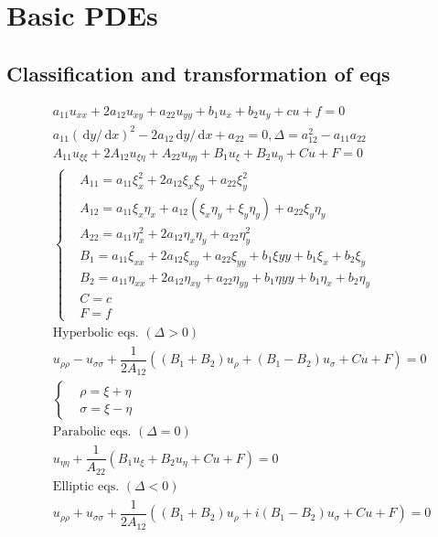 \documentclass[10pt, a4paper, twocolumn]{article}
\def\d{\,\mathrm{d}}
\begin{document}
\section{Basic PDEs}
\subsection{Classification and transformation of eqs}

	\begin{align*}
		&a_{11}u_{xx} + 2a_{12}u_{xy} + a_{22}u_{yy} + b_1u_x + b_2u_y + cu + f = 0\\
		&a_{11}\left(\d y/\d x\right)^2 - 2a_{12}\d y/\d x + a_{22} = 0, \Delta = a_{12}^2 - a_{11}a_{22}\\
		&A_{11}u_{\xi\xi} + 2A_{12}u_{\xi\eta} + A_{22}u_{\eta\eta} + B_1u_\xi + B_2u_\eta + Cu + F = 0\\
		&\left\{\begin{aligned}
			&A_{11} = a_{11}\xi_x^2 + 2a_{12}\xi_x\xi_y + a_{22}\xi_y^2\\
			&A_{12} = a_{11}\xi_x\eta_x + a_{12}(\xi_x\eta_y+\xi_y\eta_y)+a_22\xi_y\eta_y\\
			&A_{22} = a_{11}\eta_x^2 + 2a_{12}\eta_x\eta_y + a_{22}\eta_y^2\\
			&B_1=a_{11}\xi_{xx} + 2a_{12}\xi_{xy} + a_{22}\xi_{yy} + b_1\xi{yy}
			+b_1\xi_x + b_2\xi_y\\
			&B_2=a_{11}\eta_{xx} + 2a_{12}\eta_{xy} + a_{22}\eta_{yy} + b_1\eta{yy}
			+b_1\eta_x + b_2\eta_y\\
			&C=c\\
			&F=f
		\end{aligned}\right.\\
		&\text{Hyperbolic eqs. } (\Delta > 0)\\
		&u_{\rho\rho} - u_{\sigma\sigma} + \dfrac{1}{2A_{12}}
			((B_1+B_2)u_\rho + (B_1-B_2)u_\sigma + Cu + F) = 0\\
		&\left\{\begin{aligned}
			&\rho = \xi + \eta\\
			&\sigma = \xi - \eta
		\end{aligned}\right.\\
		&\text{Parabolic eqs. } (\Delta = 0)\\
		&u_{\eta\eta} + \dfrac{1}{A_{22}}
			(B_1u_\xi + B_2u_\eta + Cu + F) = 0\\
		&\text{Elliptic eqs. } (\Delta < 0)\\
		&u_{\rho\rho} + u_{\sigma\sigma} + \dfrac{1}{2A_{12}}
			((B_1+B_2)u_\rho + i(B_1-B_2)u_\sigma + Cu + F) = 0\\

\end{align*}
\end{document}
